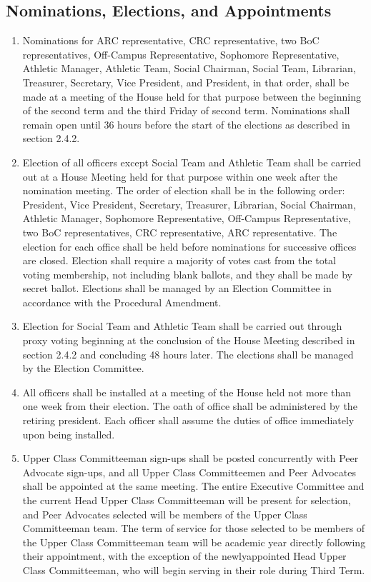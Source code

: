 \documentclass[10pt]{article} %
\begin{document}
\subsection{Nominations, Elections, and Appointments}
\begin{enumerate}
\item Nominations for ARC representative, CRC representative, two BoC representatives, Off-Campus Representative, Sophomore Representative, Athletic Manager, Athletic Team, Social Chairman, Social Team, Librarian, Treasurer, Secretary, Vice President, and President, in that order, shall be made at a meeting of the House held for that purpose between the beginning of the second term and the third Friday of second term. Nominations shall remain open until 36 hours before the start of the elections as described in section 2.4.2.
\item Election of all officers except Social Team and Athletic Team shall be carried out at a House Meeting held for that purpose within one week after the nomination meeting. The order of election shall be in the following order: President, Vice President, Secretary, Treasurer, Librarian, Social Chairman, Athletic Manager, Sophomore Representative, Off-Campus Representative, two BoC representatives, CRC representative, ARC representative. The election for each office shall be held before nominations for successive offices are closed. Election shall require a majority of votes cast from the total voting membership, not including blank ballots, and they shall be made by secret ballot. Elections shall be managed by an Election Committee in accordance with the Procedural Amendment.
\item Election for Social Team and Athletic Team shall be carried out through proxy voting beginning at the conclusion of the House Meeting described in section 2.4.2 and concluding 48 hours later. The elections shall be managed by the Election Committee.
\item All officers shall be installed at a meeting of the House held not more than one week from their election. The oath of office shall be administered by the retiring president. Each officer shall assume the duties of office immediately upon being installed.
\item Upper Class Committeeman sign-ups shall be posted concurrently with Peer Advocate sign-ups, and all Upper Class Committeemen and Peer Advocates shall be appointed at the same meeting. The entire Executive Committee and the current Head Upper Class Committeeman will be present for selection, and Peer Advocates selected will be members of the Upper Class Committeeman team. The term of service for those selected to be members of the Upper Class Committeeman team will be academic year directly following their appointment, with the exception of the newlyappointed Head Upper Class Committeeman, who will begin serving in their role during Third Term.

\end{enumerate}
\end{document}
